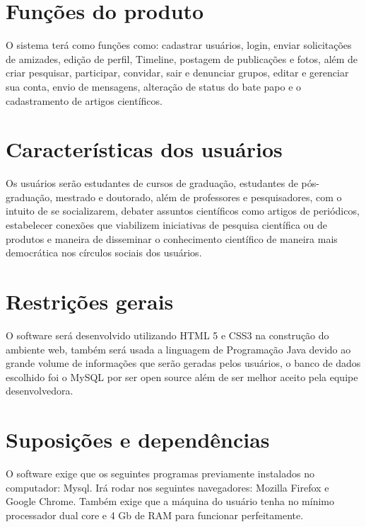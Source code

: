 \section{Funções do produto}

O sistema terá como funções como: cadastrar usuários, login, enviar solicitações de amizades, edição de perfil, Timeline, postagem de publicações e fotos, além de criar pesquisar, participar, convidar, sair e denunciar grupos, editar e gerenciar sua conta, envio de mensagens, alteração de status do bate papo e o cadastramento de artigos científicos.

\section{Características dos usuários}
Os usuários serão estudantes de cursos de graduação, estudantes de pós-graduação, mestrado e doutorado, além de professores e pesquisadores, com o intuito de se socializarem, debater assuntos científicos como artigos de periódicos, estabelecer conexões que viabilizem iniciativas de pesquisa científica ou de produtos e maneira de disseminar o conhecimento científico de maneira mais democrática nos círculos sociais dos usuários.


\section{Restrições gerais}
O software será desenvolvido utilizando HTML 5 e CSS3 na construção do ambiente web, também será usada a linguagem de Programação Java devido ao grande volume de informações que serão geradas pelos usuários, o banco de dados escolhido foi o MySQL por ser open source além de ser melhor aceito pela equipe desenvolvedora.

\section{Suposições e dependências}
O software exige que os seguintes programas previamente instalados no computador: Mysql. Irá rodar nos seguintes navegadores: Mozilla Firefox e Google Chrome. Também exige que a máquina do usuário tenha no mínimo processador dual core e 4 Gb de RAM para funcionar perfeitamente. 